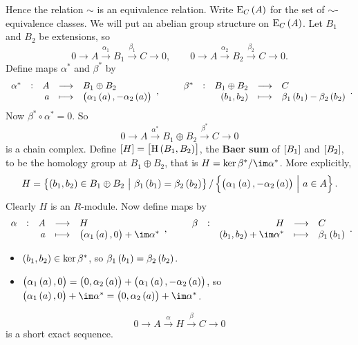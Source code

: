 Hence the relation $ \sim $ is an equivalence relation. Write $ \E_C\br{A} $ for the set of $ \sim $-equivalence classes. We will put an abelian group structure on $ \E_C\br{A} $. Let $ B_1 $ and $ B_2 $ be extensions, so
$$ 0 \to A \xrightarrow{\alpha_1} B_1 \xrightarrow{\beta_1} C \to 0, \qquad 0 \to A \xrightarrow{\alpha_2} B_2 \xrightarrow{\beta_2} C \to 0. $$
Define maps $ \alpha^* $ and $ \beta^* $ by
$$ \function[\alpha^*]{A}{B_1 \oplus B_2}{a}{\br{\alpha_1\br{a}, -\alpha_2\br{a}}}, \qquad \function[\beta^*]{B_1 \oplus B_2}{C}{\br{b_1, b_2}}{\beta_1\br{b_1} - \beta_2\br{b_2}}. $$
Now $ \beta^* \circ \alpha^* = 0 $. So
$$ 0 \to A \xrightarrow{\alpha^*} B_1 \oplus B_2 \xrightarrow{\beta^*} C \to 0 $$
is a chain complex. Define $ \sbr{H} = \sbr{\H\br{B_1, B_2}} $, the \textbf{Baer sum} of $ \sbr{B_1} $ and $ \sbr{B_2} $, to be the homology group at $ B_1 \oplus B_2 $, that is $ H = \ker \beta^* / \im \alpha^* $. More explicitly,
$$ H = \cbr{\br{b_1, b_2} \in B_1 \oplus B_2 \st \beta_1\br{b_1} = \beta_2\br{b_2}} / \cbr{\br{\alpha_1\br{a}, -\alpha_2\br{a}} \st a \in A}. $$
Clearly $ H $ is an $ R $-module. Now define maps by
$$ \function[\alpha]{A}{H}{a}{\br{\alpha_1\br{a}, 0} + \im \alpha^*}, \qquad \function[\beta]{H}{C}{\br{b_1, b_2} + \im \alpha^*}{\beta_1\br{b_1}}. $$


\begin{note*}
\hfill
\begin{itemize}
\item $ \br{b_1, b_2} \in \ker \beta^* $, so $ \beta_1\br{b_1} = \beta_2\br{b_2} $.
\item $ \br{\alpha_1\br{a}, 0} = \br{0, \alpha_2\br{a}} + \br{\alpha_1\br{a}, -\alpha_2\br{a}} $, so $ \br{\alpha_1\br{a}, 0} + \im \alpha^* = \br{0, \alpha_2\br{a}} + \im \alpha^* $.
\end{itemize}
\end{note*}

\begin{proposition}
$$ 0 \to A \xrightarrow{\alpha} H \xrightarrow{\beta} C \to 0 $$
is a short exact sequence.
\end{proposition}

